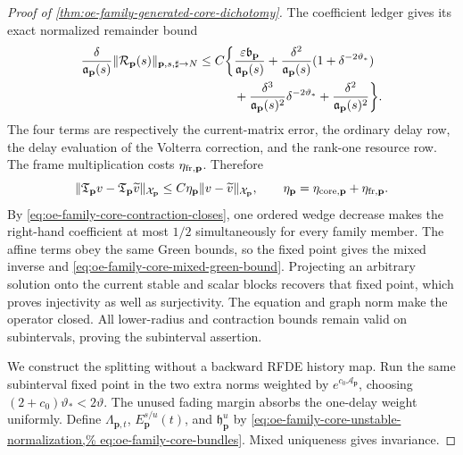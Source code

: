 \begin{proof}[Proof of
\cref{thm:oe-family-generated-core-dichotomy}]
The coefficient ledger gives its exact normalized remainder bound
\begin{align}
 \frac\delta{\mathfrak a_{\mathbf p}(s)}
 \|\mathcal R_{\mathbf p}(s)\|_{{\mathbf p,s,\sharp}\to N}
 \le C\biggl\{
 &\frac{\varepsilon\mathfrak b_{\mathbf p}}
        {\mathfrak a_{\mathbf p}(s)}
 +\frac{\delta^2}{\mathfrak a_{\mathbf p}(s)}
       (1+\delta^{-2\vartheta_*})\notag\\
 &+\frac{\delta^3}{\mathfrak a_{\mathbf p}(s)^2}
       \delta^{-2\vartheta_*}
 +\frac{\delta^2}{\mathfrak a_{\mathbf p}(s)^2}\biggr\}.
                                                        \label{eq:proof-oe-family-core-remainder-number}
\end{align}
The four terms are respectively the current-matrix error, the ordinary
delay row, the delay evaluation of the Volterra correction, and the
rank-one resource row.  The frame multiplication costs
\(\eta_{{\rm fr},\mathbf p}\).  Therefore
\begin{equation}
 \|\mathfrak T_{\mathbf p}v
       -\mathfrak T_{\mathbf p}\widetilde v\|_{
          \mathcal X_{\mathbf p}}
 \le C\eta_{\mathbf p}
       \|v-\widetilde v\|_{\mathcal X_{\mathbf p}},
 \qquad
 \eta_{\mathbf p}
 =\eta_{{\rm core},\mathbf p}+\eta_{{\rm fr},\mathbf p}.  \label{eq:proof-oe-family-core-contraction}
\end{equation}
By \cref{eq:oe-family-core-contraction-closes}, one ordered wedge decrease
makes the right-hand coefficient at most \(1/2\) simultaneously for every
family member.  The affine terms obey the same Green bounds, so the fixed
point gives the mixed inverse and
\cref{eq:oe-family-core-mixed-green-bound}.  Projecting an arbitrary
solution onto the current stable and scalar blocks recovers that fixed
point, which proves injectivity as well as surjectivity.  The equation and
graph norm make the operator closed.  All lower-radius and contraction
bounds remain valid on subintervals, proving the subinterval assertion.

We construct the splitting without a backward RFDE history map.  Run the
same subinterval fixed point in the two extra norms weighted by
\(e^{c_0\mathscr A_{\mathbf p}}\), choosing
\((2+c_0)\vartheta_*<2\vartheta\).  The unused fading margin absorbs the
one-delay weight uniformly.  Define
\(\Lambda_{\mathbf p,t}\), \(E_{\mathbf p}^{s/u}(t)\), and
\(\mathfrak h_{\mathbf p}^u\) by
\cref{eq:oe-family-core-unstable-normalization,%
eq:oe-family-core-bundles}.  Mixed uniqueness gives invariance.


\end{proof}
